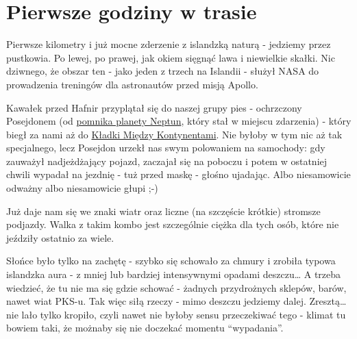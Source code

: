 \section*{Pierwsze godziny w trasie}

Pierwsze kilometry i już mocne zderzenie z islandzką naturą - jedziemy przez pustkowia. Po lewej, po prawej, jak okiem sięgnąć lawa i niewielkie skałki. Nic dziwnego, że obszar ten - jako jeden z trzech na Islandii - służył NASA do prowadzenia treningów dla astronautów przed misją Apollo.



Kawałek przed Hafnir przyplątał się do naszej grupy pies - ochrzczony Posejdonem (od \href{https://www.facebook.com/120832791270880/photos/a.612815058739315.1073741825.120832791270880/612815132072641/?type=3&theater}{pomnika planety Neptun}, który stał w miejscu zdarzenia) - który biegł za nami aż do \href{http://www.visitreykjanes.is/searchresults/attraction/bridge-between-continents}{Kładki Między Kontynentami}. Nie byłoby w tym nic aż tak specjalnego, lecz Posejdon urzekł nas swym polowaniem na samochody: gdy zauważył nadjeżdżający pojazd, zaczajał się na poboczu i potem w ostatniej chwili wypadał na jezdnię - tuż przed maskę - głośno ujadając. Albo niesamowicie odważny albo niesamowicie głupi ;-)

Już daje nam się we znaki wiatr oraz liczne (na szczęście krótkie) stromsze podjazdy. Walka z takim kombo jest szczególnie ciężka dla tych osób, które nie jeździły ostatnio za wiele.


Słońce było tylko na zachętę - szybko się schowało za chmury i zrobiła typowa islandzka aura - z mniej lub bardziej intensywnymi opadami deszczu… A trzeba wiedzieć, że tu nie ma się gdzie schować - żadnych przydrożnych sklepów, barów, nawet wiat PKS-u. Tak więc siłą rzeczy - mimo deszczu jedziemy dalej. Zresztą… nie lało tylko kropiło, czyli nawet nie byłoby sensu przeczekiwać tego - klimat tu bowiem taki, że możnaby się nie doczekać momentu “wypadania”.

